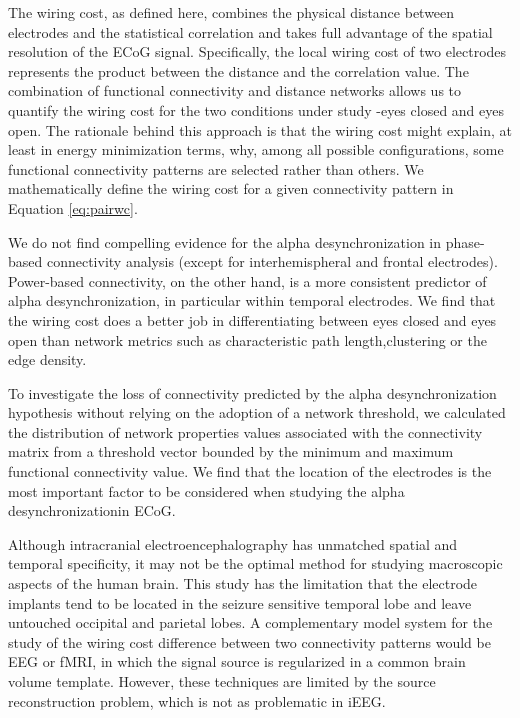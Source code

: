 \documentclass[11pt, onecolumn]{article}
\begin{document}
The wiring cost, as defined here, combines the physical distance between electrodes and the statistical correlation and takes full advantage of the spatial resolution of the ECoG signal. Specifically, the local wiring cost of two electrodes represents the product between the distance and the correlation value. The combination of functional connectivity and distance networks allows us to quantify the wiring cost for the two conditions under study -eyes closed and eyes open.
The rationale behind this approach is that the wiring cost might explain, at least in energy minimization terms, why, among all possible configurations, some functional connectivity patterns are selected rather than others. We mathematically define the wiring cost for a given connectivity pattern in Equation \ref{eq:pairwc}. 

We do not find compelling evidence for the alpha desynchronization in phase-based connectivity analysis (except for interhemispheral and frontal electrodes). Power-based connectivity, on the other hand, is a more consistent predictor of alpha desynchronization, in particular within temporal electrodes. We find that the wiring cost does a better job in differentiating between eyes closed and eyes open than network metrics such as characteristic path length,clustering or the edge density.

To investigate the loss of connectivity predicted by the alpha desynchronization hypothesis without relying on the adoption of a network threshold, we calculated the distribution of network properties values associated with the connectivity matrix from a threshold vector bounded by the minimum and maximum functional connectivity value.
We find that the location of the electrodes is the most important factor to be considered when studying the alpha 
desynchronizationin ECoG.

Although intracranial electroencephalography has unmatched spatial and temporal specificity, it may not be the optimal method for studying macroscopic aspects of the human brain. This study has the limitation that the electrode implants tend to be located in the seizure sensitive temporal lobe and leave untouched occipital and parietal lobes. %
A complementary model system for the study of the wiring cost difference between two connectivity patterns would be EEG or fMRI, in which the signal source is regularized in a common brain volume template. 
However, these techniques are limited by the source reconstruction problem, which is not as problematic in iEEG. 
\end{document}
